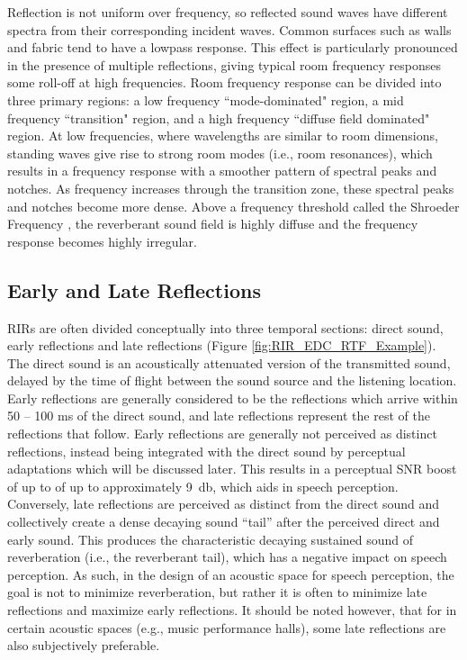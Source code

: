 Reflection is not uniform over frequency, so reflected sound waves have different spectra from their corresponding incident waves. Common surfaces such as walls and fabric tend to have a lowpass response. This effect is particularly pronounced in the presence of multiple reflections, giving typical room frequency responses some roll-off at high frequencies. Room frequency response can be divided into three primary regions: a low frequency ``mode-dominated" region, a mid frequency ``transition" region, and a high frequency ``diffuse field dominated" region. At low frequencies, where wavelengths are similar to room dimensions, standing waves give rise to strong room modes (i.e., room resonances), which results in a frequency response with a smoother pattern of spectral peaks and notches. As frequency increases through the transition zone, these spectral peaks and notches become more dense. Above a frequency threshold called the Shroeder Frequency \citep{schroeder1962frequency}, the reverberant sound field is highly diffuse and the frequency response becomes highly irregular.

\subsection{Early and Late Reflections} \label{section:early_late_reverb}

RIRs are often divided conceptually into three temporal sections: direct sound, early reflections and late reflections (Figure \ref{fig:RIR_EDC_RTF_Example}). The direct sound is an acoustically attenuated version of the transmitted sound, delayed by the time of flight between the sound source and the listening location.  Early reflections are generally considered to be the reflections which arrive within 50 -- 100 \unit{\milli\second} of the direct sound, and late reflections represent the rest of the reflections that follow.  Early reflections are generally not perceived as distinct reflections, instead being integrated with the direct sound by perceptual adaptations which will be discussed later. This results in a perceptual SNR boost of up to of up to approximately \qty{9}{\decibel}, which aids in speech perception. Conversely, late reflections are perceived as distinct from the direct sound and collectively create a dense decaying sound ``tail” after the perceived direct and early sound. This produces the characteristic decaying sustained sound of reverberation (i.e., the reverberant tail), which has a negative impact on speech perception. As such, in the design of an acoustic space for speech perception, the goal is not to minimize reverberation, but rather it is often to minimize late reflections and maximize early reflections. It should be noted however, that for in certain acoustic spaces (e.g., music performance halls), some late reflections are also subjectively preferable. 

